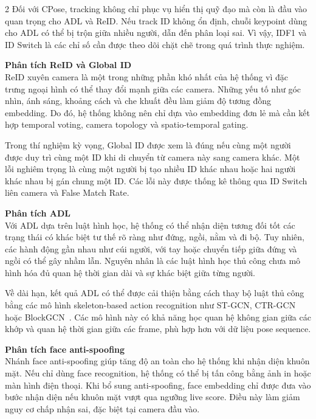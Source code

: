\documentclass[a4paper, twoside, 12pt]{article}
\begin{document}
\begin{multicols}{2}
Đối với CPose, tracking không chỉ phục vụ hiển thị quỹ đạo mà còn là đầu vào quan trọng cho ADL và ReID. Nếu track ID không ổn định, chuỗi keypoint dùng cho ADL có thể bị trộn giữa nhiều người, dẫn đến phân loại sai. Vì vậy, IDF1 và ID Switch là các chỉ số cần được theo dõi chặt chẽ trong quá trình thực nghiệm.

\vspace{0.1cm}
\hspace*{0.5cm}\textbf{Phân tích ReID và Global ID}\\
ReID xuyên camera là một trong những phần khó nhất của hệ thống vì đặc trưng ngoại hình có thể thay đổi mạnh giữa các camera. Những yếu tố như góc nhìn, ánh sáng, khoảng cách và che khuất đều làm giảm độ tương đồng embedding. Do đó, hệ thống không nên chỉ dựa vào embedding đơn lẻ mà cần kết hợp temporal voting, camera topology và spatio-temporal gating.

Trong thí nghiệm kỳ vọng, Global ID được xem là đúng nếu cùng một người được duy trì cùng một ID khi di chuyển từ camera này sang camera khác. Một lỗi nghiêm trọng là cùng một người bị tạo nhiều ID khác nhau hoặc hai người khác nhau bị gán chung một ID. Các lỗi này được thống kê thông qua ID Switch liên camera và False Match Rate.

\vspace{0.1cm}
\hspace*{0.5cm}\textbf{Phân tích ADL}\\
Với ADL dựa trên luật hình học, hệ thống có thể nhận diện tương đối tốt các trạng thái có khác biệt tư thế rõ ràng như đứng, ngồi, nằm và đi bộ. Tuy nhiên, các hành động gần nhau như cúi người, với tay hoặc chuyển tiếp giữa đứng và ngồi có thể gây nhầm lẫn. Nguyên nhân là các luật hình học thủ công chưa mô hình hóa đủ quan hệ thời gian dài và sự khác biệt giữa từng người.

Về dài hạn, kết quả ADL có thể được cải thiện bằng cách thay bộ luật thủ công bằng các mô hình skeleton-based action recognition như ST-GCN, CTR-GCN hoặc BlockGCN~\cite{yan2018stgcn,chen2021ctrgcn,zhou2024blockgcn}. Các mô hình này có khả năng học quan hệ không gian giữa các khớp và quan hệ thời gian giữa các frame, phù hợp hơn với dữ liệu pose sequence.

\vspace{0.1cm}
\hspace*{0.5cm}\textbf{Phân tích face anti-spoofing}\\
Nhánh face anti-spoofing giúp tăng độ an toàn cho hệ thống khi nhận diện khuôn mặt. Nếu chỉ dùng face recognition, hệ thống có thể bị tấn công bằng ảnh in hoặc màn hình điện thoại. Khi bổ sung anti-spoofing, face embedding chỉ được đưa vào bước nhận diện nếu khuôn mặt vượt qua ngưỡng live score. Điều này làm giảm nguy cơ chấp nhận sai, đặc biệt tại camera đầu vào.


\end{multicols}
\end{document}
